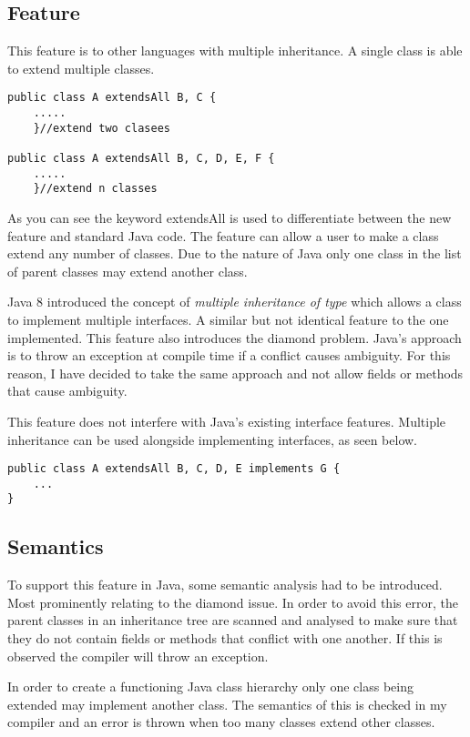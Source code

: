 \documentclass[twocolumn]{article} 	%
\begin{document}
\subsection{Feature}
This feature is to other languages with multiple inheritance. A single class is able to extend multiple classes. 
\begin{lstlisting}
public class A extendsAll B, C {	
	.....
	}//extend two clasees
	
public class A extendsAll B, C, D, E, F {
	.....
	}//extend n classes
\end{lstlisting}
As you can see the keyword extendsAll is used to differentiate between the new feature and standard Java code. The feature can allow a user to make a class extend any number of classes. Due to the nature of Java only one class in the list of parent classes may extend another class. 


Java 8 introduced the concept of \emph{multiple inheritance of type} which allows a class to implement multiple interfaces.\cite{java8} A similar but not identical feature to the one implemented. This feature also introduces the diamond problem. Java's approach is to throw an exception at compile time if a conflict causes ambiguity.\cite{javaCompiler} For this reason, I have decided to take the same approach and not allow fields or methods that cause ambiguity.


This feature does not interfere with Java's existing interface features. Multiple inheritance can be used alongside implementing interfaces, as seen below.
\begin{lstlisting}
public class A extendsAll B, C, D, E implements G {
	...
}
\end{lstlisting}

\subsection{Semantics}
To support this feature in Java, some semantic analysis had to be introduced. Most prominently relating to the diamond issue. In order to avoid this error, the parent classes in an inheritance tree are scanned and analysed to make sure that they do not contain fields or methods that conflict with one another. If this is observed the compiler will throw an exception.

In order to create a functioning Java class hierarchy only one class being extended may implement another class. The semantics of this is checked in my compiler and an error is thrown when too many classes extend other classes.
\end{document}
